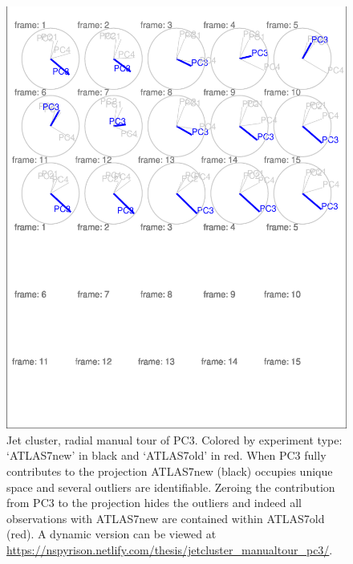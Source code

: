 \documentclass{monashthesis}
\begin{document}
\begin{figure}
\centering
\includegraphics{thesis_files/figure-latex/JetClusterGood-1.pdf}
\caption{\label{fig:JetClusterGood}Jet cluster, radial manual tour of PC3. Colored by experiment type: `ATLAS7new' in black and `ATLAS7old' in red. When PC3 fully contributes to the projection ATLAS7new (black) occupies unique space and several outliers are identifiable. Zeroing the contribution from PC3 to the projection hides the outliers and indeed all observations with ATLAS7new are contained within ATLAS7old (red). A dynamic version can be viewed at \url{https://nspyrison.netlify.com/thesis/jetcluster_manualtour_pc3/}.}
\end{figure}
\end{document}

